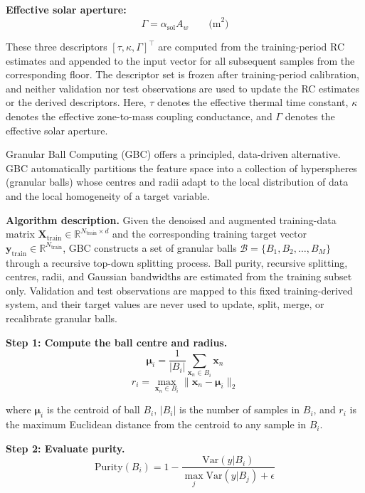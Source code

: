 \documentclass[11pt]{article}
\begin{document}
\textbf{Effective solar aperture:}
\begin{equation}
\Gamma=\alpha_{\mathrm{sol}}A_w \qquad \text{(m}^2\text{)}
\end{equation}

These three descriptors $[\tau,\kappa,\Gamma]^\top$ are computed from the training-period RC estimates and appended to the input vector for all subsequent samples from the corresponding floor. The descriptor set is frozen after training-period calibration, and neither validation nor test observations are used to update the RC estimates or the derived descriptors. Here, $\tau$ denotes the effective thermal time constant, $\kappa$ denotes the effective zone-to-mass coupling conductance, and $\Gamma$ denotes the effective solar aperture.

Granular Ball Computing (GBC) offers a principled, data-driven alternative. GBC automatically partitions the feature space into a collection of hyperspheres (granular balls) whose centres and radii adapt to the local distribution of data and the local homogeneity of a target variable.

\textbf{Algorithm description.} Given the denoised and augmented training-data matrix $\mathbf{X}_{\mathrm{train}} \in \mathbb{R}^{N_{\mathrm{train}} \times d}$ and the corresponding training target vector $\mathbf{y}_{\mathrm{train}} \in \mathbb{R}^{N_{\mathrm{train}}}$, GBC constructs a set of granular balls $\mathcal{B} = \{B_1, B_2, \ldots, B_M\}$ through a recursive top-down splitting process. Ball purity, recursive splitting, centres, radii, and Gaussian bandwidths are estimated from the training subset only. Validation and test observations are mapped to this fixed training-derived system, and their target values are never used to update, split, merge, or recalibrate granular balls.

\textbf{Step 1: Compute the ball centre and radius.}
\begin{equation}
\boldsymbol{\mu}_i = \frac{1}{|B_i|} \sum_{\mathbf{x}_n \in B_i} \mathbf{x}_n
\end{equation}
\begin{equation}
r_i = \max_{\mathbf{x}_n \in B_i} \|\mathbf{x}_n - \boldsymbol{\mu}_i\|_2
\end{equation}

where $\boldsymbol{\mu}_i$ is the centroid of ball $B_i$, $|B_i|$ is the number of samples in $B_i$, and $r_i$ is the maximum Euclidean distance from the centroid to any sample in $B_i$.

\textbf{Step 2: Evaluate purity.}
\begin{equation}
\text{Purity}(B_i) = 1 - \frac{\text{Var}(y | B_i)}{\max_{j} \text{Var}(y | B_j) + \epsilon}
\end{equation}
\end{document}
